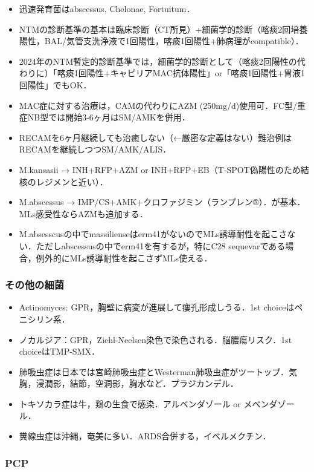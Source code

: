 \begin{itemize}
\item 迅速発育菌はabscessus, Chelonae, Fortuitum．
\item NTMの診断基準の基本は臨床診断（CT所見）+細菌学的診断（喀痰2回培養陽性，BAL/気管支洗浄液で1回陽性，喀痰1回陽性+肺病理がcompatible）．
\item 2024年のNTM暫定的診断基準では，細菌学的診断として（喀痰2回陽性の代わりに）「喀痰1回陽性+キャピリアMAC抗体陽性」or「喀痰1回陽性+胃液1回陽性」でもOK．
\item MAC症に対する治療は，CAMの代わりにAZM (250mg/d)使用可．FC型/重症NB型では開始3-6ヶ月はSM/AMKを併用．
\item RECAMを6ヶ月継続しても治癒しない（←厳密な定義はない）難治例はRECAMを継続しつつSM/AMK/ALIS．
\item M.kansasii → INH+RFP+AZM or INH+RFP+EB（T-SPOT偽陽性のため結核のレジメンと近い）．
\item M.abscessus → IMP/CS+AMK+クロファジミン（ランプレン®）．が基本．MLs感受性ならAZMも追加する．
\item M.absesscusの中でmassilienseはerm41がないのでMLs誘導耐性を起こさない．ただしabscessusの中でerm41を有するが，特にC28 sequevarである場合，例外的にMLs誘導耐性を起こさずMLs使える．
\end{itemize}


\subsubsection{その他の細菌}

\begin{itemize}
\item Actinomyces: GPR，胸壁に病変が進展して瘻孔形成しうる．1st choiceはペニシリン系．
\item ノカルジア：GPR，Ziehl-Neelsen染色で染色される．脳膿瘍リスク．1st choiceはTMP-SMX．
\item 肺吸虫症は日本では宮崎肺吸虫症とWesterman肺吸虫症がツートップ．気胸，浸潤影，結節，空洞影，胸水など．プラジカンデル．
\item トキソカラ症は牛，鶏の生食で感染．アルベンダゾール or メベンダゾール．
\item 糞線虫症は沖縄，奄美に多い．ARDS合併する，イベルメクチン．
\end{itemize}


\subsubsection{PCP}

